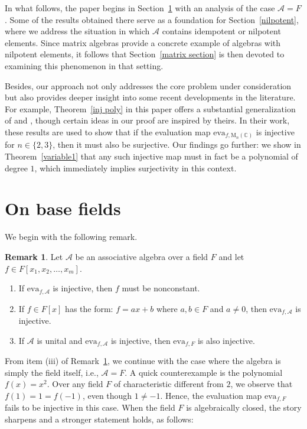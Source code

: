 \documentclass{amsart}
\theoremstyle{definition}
\newtheorem{remark}[theorem]{Remark}%
\begin{document}
	In what follows, the paper begins in Section~\ref{section base} with an analysis of the case $\mathcal{A}=F$. Some of the results obtained there serve as a foundation for Section~\ref{nilpotent}, where we address the situation in which $\mathcal{A}$ contains idempotent or nilpotent elements. Since matrix algebras provide a concrete example of algebras with nilpotent elements, it follows that Section~\ref{matrix section} is then devoted to examining this phenomenon in that setting.
	
	Besides, our approach not only addresses the core problem under consideration but also provides deeper insight into some recent developments in the literature. For example, Theorem~\ref{inj poly} in this paper offers a substantial generalization of \cite[Lemma~4.2]{Pa_BuReSa_19} and \cite[Proposition~2.1]{Pa_BuReSa_21}, though certain ideas in our proof are inspired by theirs. In their work, these results are used to show that if the evaluation map \( \mathrm{eva}_{f, \mathrm{M}_n(\mathbb{C})} \) is injective for \( n \in \{2,3\} \), then it must also be surjective. Our findings go further: we show in Theorem~\ref{variable1} that any such injective map must in fact be a polynomial of degree $1$, which immediately implies surjectivity in this context.
	
	\section{On base fields}\label{section base}
	
	We begin with the following remark.
	
	\begin{remark} \label{remark}
		Let $\mathcal{A}$ be an associative algebra over a field $F$ and let $f\in F[x_1,x_2,\ldots,x_m]$.
		\begin{enumerate}[\rm (i)]
			\item If $\mathrm{eva}_{f,\mathcal{A}}$ is injective, then $f$ must be nonconstant. 
			\item If $f\in F[x]$ has the form: $f=ax+b$ where $a,b\in F$ and $a\neq0$, then $\mathrm{eva}_{f,\mathcal{A}}$ is injective.
			\item If $\mathcal{A}$ is unital and $\mathrm{eva}_{f,\mathcal{A}}$ is injective, then $\mathrm{eva}_{f,F}$ is also injective.
		\end{enumerate}
	\end{remark}
	
	From item (iii) of Remark~\ref{remark}, we continue with the case where the algebra is simply the field itself, i.e., $\mathcal{A} = F$. A quick counterexample is  the polynomial $f(x) = x^2$. Over any field $F$ of characteristic different from $2$, we observe that $f(1) = 1 = f(-1)$, even though $1 \ne -1$. Hence, the evaluation map $\mathrm{eva}_{f, F}$ fails to be injective in this case.	When the field $F$ is algebraically closed,  the story sharpens and a stronger statement holds, as follows:
	
\end{document}
